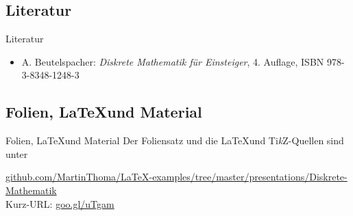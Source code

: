 \subsection{Literatur}
\begin{frame}{Literatur}
\begin{itemize}
    \item A. Beutelspacher: \textit{Diskrete Mathematik für Einsteiger}, 4. Auflage, ISBN 978-3-8348-1248-3
\end{itemize}
\end{frame}

\subsection{Folien, \LaTeX und Material}
\begin{frame}{Folien, \LaTeX und Material}
Der Foliensatz und die \LaTeX und Ti\textit{k}Z-Quellen sind unter

\href{https://github.com/MartinThoma/LaTeX-examples/tree/master/presentations/Diskrete-Mathematik}{github.com/MartinThoma/LaTeX-examples/tree/master/presentations/Diskrete-Mathematik}
\\

Kurz-URL:
\href{http://goo.gl/uTgam}{goo.gl/uTgam}
\end{frame}

